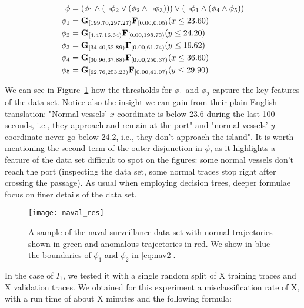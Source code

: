 \begin{equation}
    \label{eq:nav2}
\begin{aligned}
    \phi & = ( \phi_1 \wedge (\neg \phi_2 \vee (\phi_2 \wedge \neg \phi_3))) \vee (\neg \phi_1 \wedge (\phi_4 \wedge \phi_5)) \\
    \phi_1 & = \mathbf{G}_{[199.70, 297.27)} \mathbf{F}_{[0.00, 0.05)} (x \le 23.60) \\
    \phi_2 & = \mathbf{G}_{[4.47, 16.64)} \mathbf{F}_{[0.00, 198.73)} (y \le 24.20) \\
    \phi_3 & = \mathbf{G}_{[34.40, 52.89)} \mathbf{F}_{[0.00, 61.74)} (y \le 19.62) \\
    \phi_4 & = \mathbf{G}_{[30.96, 37.88)} \mathbf{F}_{[0.00, 250.37)} (x \le 36.60) \\
    \phi_5 & = \mathbf{G}_{[62.76, 253.23)} \mathbf{F}_{[0.00, 41.07)} (y \le 29.90)
\end{aligned}
\end{equation}

We can see in Figure~\ref{fig:navalresults} how the thresholds for $\phi_1$ and $\phi_2$ capture the key features of the data set. Notice also the insight we can gain from their plain English translation: "Normal vessels' $x$ coordinate is below 23.6 during the last 100 seconds, i.e., they approach and remain at the port" and "normal vessels' $y$ coordinate never go below 24.2, i.e., they don't approach the island". It is worth mentioning the second term of the outer disjunction in $\phi$, as it highlights a feature of the data set difficult to spot on the figures: some normal vessels don't reach the port (inspecting the data set, some normal traces stop right after crossing the passage). As usual when employing decision trees, deeper formulae focus on finer details of the data set.

\begin{figure}
    \centering
    \texttt{[image: naval\_res]}
    \caption{A sample of the naval surveillance data set with normal trajectories shown in green and anomalous trajectories in red. We show in blue the boundaries of $\phi_1$ and $\phi_2$ in \ref{eq:nav2}.}
    \label{fig:navalresults}
\end{figure}

In the case of $I_1$, we tested it with a single random split of {\color{red}X} training traces and {\color{red}X} validation traces. We obtained for this experiment a misclassification rate of {\color{red}X}, with a run time of about {\color{red}X} minutes and the following formula:

